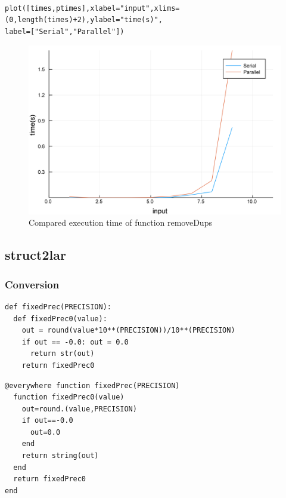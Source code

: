 \documentclass[a4paper,12pt]{article}
\begin{document}
\noindent{}
\begin{Verbatim}[fontsize=\footnotesize]

plot([times,ptimes],xlabel="input",xlims=(0,length(times)+2),ylabel="time(s)",
label=["Serial","Parallel"])

\end{Verbatim}
\begin{figure}[!h]
	\centering
	\includegraphics[scale=0.08]{removeDupsC.png}
	\caption{Compared execution time of function removeDups}
\end{figure}
\newpage

\subsection{struct2lar}
\subsubsection{Conversion}
\noindent {}
\begin{multicols}{2}
\noindent {}
\begin{Verbatim}[fontsize=\scriptsize]
def fixedPrec(PRECISION):
  def fixedPrec0(value):
    out = round(value*10**(PRECISION))/10**(PRECISION)
    if out == -0.0: out = 0.0
      return str(out)
    return fixedPrec0 
\end{Verbatim}
\columnbreak
{}
\begin{Verbatim}[fontsize=\scriptsize]
@everywhere function fixedPrec(PRECISION)
  function fixedPrec0(value) 
    out=round.(value,PRECISION)
    if out==-0.0
      out=0.0
    end
    return string(out)
  end
  return fixedPrec0
end
\end{Verbatim}
\end{multicols}
\end{document}
